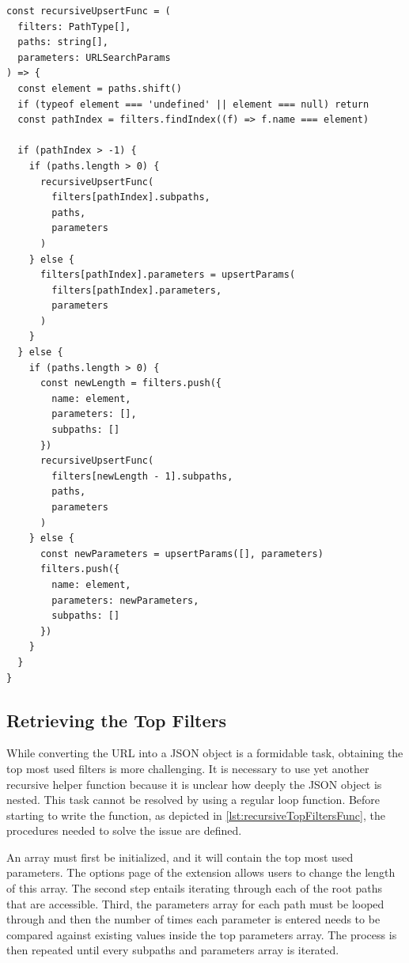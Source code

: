 \begin{lstlisting}[style=ES6, caption={Recursive pathname to JSON function (TypeScript)}, label={lst:recursiveUpsertFunc}]
const recursiveUpsertFunc = (
  filters: PathType[],
  paths: string[],
  parameters: URLSearchParams
) => {
  const element = paths.shift()
  if (typeof element === 'undefined' || element === null) return
  const pathIndex = filters.findIndex((f) => f.name === element)

  if (pathIndex > -1) {
    if (paths.length > 0) {
      recursiveUpsertFunc(
        filters[pathIndex].subpaths,
        paths,
        parameters
      )
    } else {
      filters[pathIndex].parameters = upsertParams(
        filters[pathIndex].parameters,
        parameters
      )
    }
  } else {
    if (paths.length > 0) {
      const newLength = filters.push({
        name: element,
        parameters: [],
        subpaths: []
      })
      recursiveUpsertFunc(
        filters[newLength - 1].subpaths,
        paths,
        parameters
      )
    } else {
      const newParameters = upsertParams([], parameters)
      filters.push({
        name: element,
        parameters: newParameters,
        subpaths: []
      })
    }
  }
}
\end{lstlisting}

\subsection*{Retrieving the Top Filters}
While converting the URL into a JSON object is a formidable task, obtaining the top most used filters is more challenging. It is necessary to use yet another recursive helper function because it is unclear how deeply the JSON object is nested. This task cannot be resolved by using a regular loop function. Before starting to write the function, as depicted in \autoref{lst:recursiveTopFiltersFunc}, the procedures needed to solve the issue are defined.

An array must first be initialized, and it will contain the top most used parameters. The options page of the extension allows users to change the length of this array. The second step entails iterating through each of the root paths that are accessible. Third, the parameters array for each path must be looped through and then the number of times each parameter is entered needs to be compared against existing values inside the top parameters array. The process is then repeated until every subpaths and parameters array is iterated.

